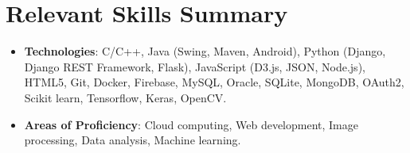 \documentclass[letterpaper,11pt]{article}
\newcommand{\resumeItem}[2]{
  \item\small{
    \textbf{#1}{: #2 \vspace{-2pt}}
  }
}
\newcommand{\resumeSubItem}[2]{\resumeItem{#1}{#2}\vspace{-4pt}}
\newcommand{\resumeSubHeadingListStart}{\begin{itemize}[leftmargin=*]}
\newcommand{\resumeSubHeadingListEnd}{\end{itemize}}
\begin{document}
\section{Relevant Skills Summary}
  \resumeSubHeadingListStart
    \resumeSubItem{Technologies}
        {C/C++, Java (Swing, Maven, Android), Python (Django, Django REST Framework, Flask), JavaScript (D3.js, JSON, Node.js), HTML5, Git, Docker, Firebase, MySQL, Oracle, SQLite, MongoDB, OAuth2, Scikit learn, Tensorflow, Keras, OpenCV.}
      \item{
     \textbf{Areas of Proficiency}{: Cloud computing, Web development, Image processing, Data analysis, Machine learning.}
    }
  \resumeSubHeadingListEnd
\end{document}
